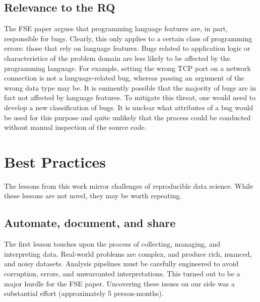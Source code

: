 \documentclass[acmsmall]{acmart}
\begin{document}
\subsection{Relevance to the RQ} 
The FSE paper argues that programming language features are, in part,
responsible for bugs. Clearly, this only applies to a certain class of
programming errors: those that rely on language features.  Bugs related to
application logic or characteristics of the problem domain are less likely
to be affected by the programming language. For example, setting the wrong
TCP port on a network connection is not a language-related bug, whereas
passing an argument of the wrong data type may be. It is eminently possible
that the majority of bugs are in fact not affected by language features. To
mitigate this threat, one would need to develop a new classification of
bugs. It is unclear what attributes of a bug would be used for this purpose
and quite unlikely that the process could be conducted without manual
inspection of the source code.


\section{Best Practices}\label{best}

The lessons from this work mirror challenges of reproducible data science.
While these lessons are not novel, they may be worth repeating.  


\subsection{Automate, document, and share} 
The first lesson touches upon the process of collecting, managing, and
interpreting data.  Real-world problems are complex, and produce rich,
nuanced, and noisy datasets. Analysis pipelines must be carefully engineered
to avoid corruption, errors, and unwarranted interpretations. This turned
out to be a major hurdle for the FSE paper. Uncovering these issues on our
side was a substantial effort (approximately 5 person-months). 
\end{document}

